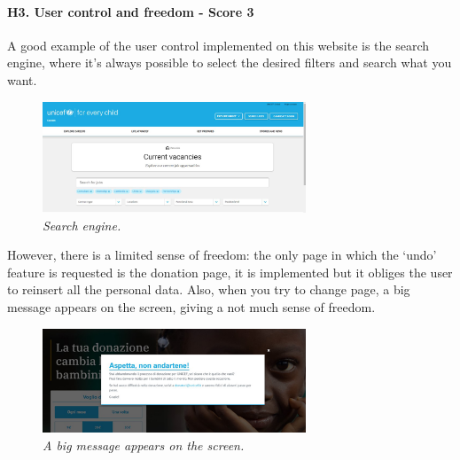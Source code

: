 \newline \paragraph{H3. User control and freedom - Score 3} \label{subsec:H3}	A good example of the user control implemented on this website is the search engine, where it’s always possible to select the desired filters and search what you want.
\begin{figure}[!h]
	\begin{center}
		\includegraphics[width=0.7\textwidth]{FinalScores6.jpg}
		\captionsetup{font=small}
		\caption{\textit{Search engine.}}
	\end{center}
\end{figure}
\newline However, there is a limited sense of freedom: the only page in which the ‘undo’ feature is requested is the donation page, it is implemented but it obliges the user to reinsert all the personal data.
\newline Also, when you try to change page, a big message appears on the screen, giving a not much sense of freedom.
\begin{figure}[!h]
	\begin{center}
		\includegraphics[width=0.7\textwidth]{FinalScores7.jpg}
		\captionsetup{font=small}
		\caption{\textit{A big message appears on the screen.}}
	\end{center}
\end{figure}
\newline
